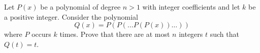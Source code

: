 Let $P(x)$ be a polynomial of degree $n > 1$
with integer coefficients and let $k$ be a positive integer.
Consider the polynomial
\[ Q(x) = P(P(\dots P(P(x)) \dots )) \] where $P$ occurs $k$ times.
Prove that there are at most $n$ integers $t$ such that $Q(t) = t$.